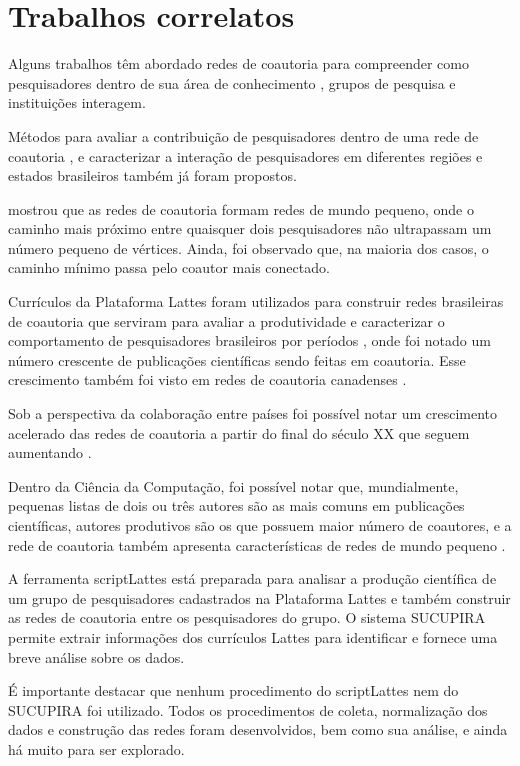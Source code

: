 \chapter[Trabalhos correlatos]{Trabalhos correlatos}

Alguns trabalhos têm abordado redes de coautoria para compreender como pesquisadores dentro de sua área de conhecimento \cite{franceschet2011collaboration, santin2016collaboration}, grupos de pesquisa \cite{delgado2014analyzing} e instituições \cite{ioannidis2008measuring} interagem.

Métodos para avaliar a contribuição de pesquisadores dentro de uma rede de coautoria \cite{liu2005co, franceschet2011collaboration}, e caracterizar a interação de pesquisadores em diferentes regiões e estados brasileiros \cite{sidone2016ciencia} também já foram propostos.

 mostrou que as redes de coautoria formam redes de mundo pequeno, onde o caminho mais próximo entre quaisquer dois pesquisadores não ultrapassam um número pequeno de vértices. Ainda, foi observado que, na maioria dos casos, o caminho mínimo passa pelo coautor mais conectado.

Currículos da Plataforma Lattes foram utilizados para construir redes brasileiras de coautoria que serviram para avaliar a produtividade e caracterizar o comportamento de pesquisadores brasileiros por períodos \cite{mena2014brazilian}, onde foi notado um número crescente de publicações científicas sendo feitas em coautoria. Esse crescimento também foi visto em redes de coautoria canadenses \cite{lariviere2006canadian}.

Sob a perspectiva da colaboração entre países foi possível notar um crescimento acelerado das redes de coautoria a partir do final do século XX \cite{glanzel2004analysing} que seguem aumentando \cite{lariviere2006canadian}.

Dentro da Ciência da Computação, foi possível notar que, mundialmente, pequenas listas de dois ou três autores são as mais comuns em publicações científicas, autores produtivos são os que possuem maior número de coautores, e a rede de coautoria também apresenta características de redes de mundo pequeno \cite{franceschet2011collaboration}.

A ferramenta scriptLattes \cite{mena2009scriptlattes} está preparada para analisar a produção científica de um grupo de pesquisadores cadastrados na Plataforma Lattes e também construir as redes de coautoria entre os pesquisadores do grupo. O sistema SUCUPIRA \cite{alves2011sucupira} permite extrair informações dos currículos Lattes para identificar e fornece uma breve análise sobre os dados.

É importante destacar que nenhum procedimento do scriptLattes nem do SUCUPIRA foi utilizado. Todos os procedimentos de coleta, normalização dos dados e construção das redes foram desenvolvidos, bem como sua análise, e ainda há muito para ser explorado.
